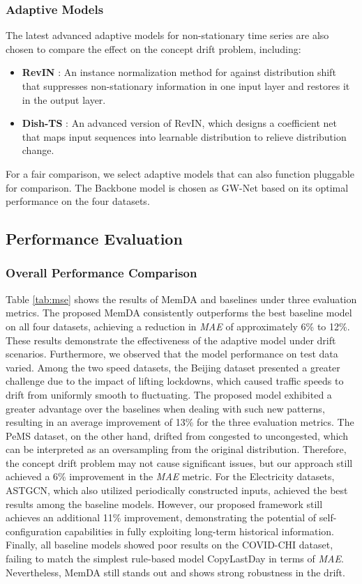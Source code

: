 \documentclass[sigconf]{acmart}
\begin{document}
\subsubsection{Adaptive Models}
The latest advanced adaptive models for non-stationary time series are also chosen to compare the effect on the concept drift problem, including:
\begin{itemize}
    \item \textbf{RevIN} \cite{kim2021reversible}: An instance normalization method for against distribution shift that suppresses non-stationary information in one input layer and restores it in the output layer.
    \item \textbf{Dish-TS} \cite{fan2023dish}: An advanced version of RevIN, which designs a coefficient net that maps input sequences into learnable distribution to relieve distribution change.
\end{itemize}
For a fair comparison, we select adaptive models that can also function pluggable for comparison. The Backbone model is chosen as GW-Net based on its optimal performance on the four datasets.

\subsection{Performance Evaluation}
\subsubsection{Overall Performance Comparison}
Table \ref{tab:mse} shows the results of MemDA and baselines under three evaluation metrics. The proposed MemDA consistently outperforms the best baseline model on all four datasets, achieving a reduction in \textit{MAE} of approximately 6\% to 12\%. These results demonstrate the effectiveness of the adaptive model under drift scenarios. Furthermore, we observed that the model performance on test data varied. Among the two speed datasets, the Beijing dataset presented a greater challenge due to the impact of lifting lockdowns, which caused traffic speeds to drift from uniformly smooth to fluctuating. The proposed model exhibited a greater advantage over the baselines when dealing with such new patterns, resulting in an average improvement of 13\% for the three evaluation metrics. The PeMS dataset, on the other hand, drifted from congested to uncongested, which can be interpreted as an oversampling from the original distribution. Therefore, the concept drift problem may not cause significant issues, but our approach still achieved a 6\% improvement in the \textit{MAE} metric. For the Electricity datasets, ASTGCN, which also utilized periodically constructed inputs, achieved the best results among the baseline models. However, our proposed framework still achieves an additional 11\% improvement, demonstrating the potential of self-configuration capabilities in fully exploiting long-term historical information. Finally, all baseline models showed poor results on the COVID-CHI dataset, failing to match the simplest rule-based model CopyLastDay in terms of \textit{MAE}. Nevertheless, MemDA still stands out and shows strong robustness in the drift.
\end{document}
